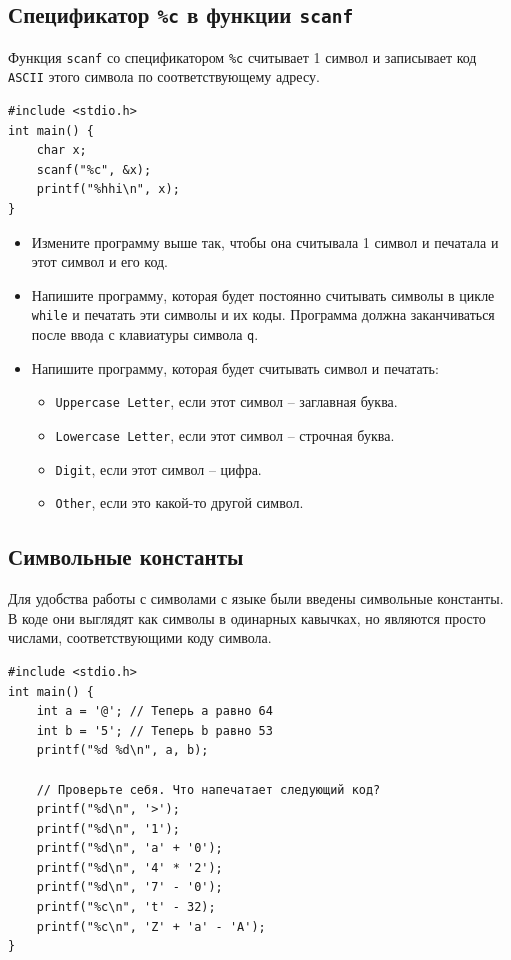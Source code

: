 \documentclass{article}
\begin{document}
\subsection*{Спецификатор \texttt{\%c} в функции \texttt{scanf}}
Функция \texttt{scanf} со спецификатором \texttt{\%c} считывает 1 символ и записывает код \texttt{ASCII} этого символа по соответствующему адресу.
\begin{lstlisting}
#include <stdio.h>
int main() {
    char x; 
    scanf("%c", &x);
    printf("%hhi\n", x);
}
\end{lstlisting}

\begin{itemize}
\item Измените программу выше так, чтобы она считывала 1 символ и печатала и этот символ и его код.
\item Напишите программу, которая будет постоянно считывать символы в цикле \texttt{while} и печатать эти символы и их коды. Программа должна заканчиваться после ввода с клавиатуры символа \texttt{q}.
\item Напишите программу, которая будет считывать символ и печатать:
\begin{itemize}
\item \texttt{Uppercase Letter}, если этот символ -- заглавная буква.
\item \texttt{Lowercase Letter}, если этот символ -- строчная буква.
\item \texttt{Digit}, если этот символ -- цифра.
\item \texttt{Other}, если это какой-то другой символ.
\end{itemize}
\end{itemize}

\subsection*{Символьные константы}
Для удобства работы с символами с языке были введены символьные константы. В коде они выглядят как символы в одинарных кавычках, но являются просто числами, соответствующими коду символа.
\begin{lstlisting}
#include <stdio.h>
int main() {
    int a = '@'; // Теперь a равно 64
    int b = '5'; // Теперь b равно 53
    printf("%d %d\n", a, b);
	
    // Проверьте себя. Что напечатает следующий код?
    printf("%d\n", '>');
    printf("%d\n", '1');
    printf("%d\n", 'a' + '0');
    printf("%d\n", '4' * '2');
    printf("%d\n", '7' - '0');
    printf("%c\n", 't' - 32);
    printf("%c\n", 'Z' + 'a' - 'A');
}
\end{lstlisting}
\end{document}
